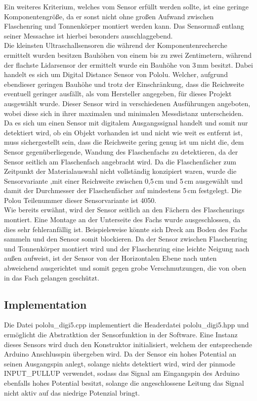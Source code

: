         Ein weiteres Kriterium, welches vom Sensor erfüllt werden sollte, ist eine geringe Komponentengröße, da er sonst nicht ohne großen Aufwand zwischen Flaschenring und Tonnenkörper montiert werden kann. Das Sensormaß entlang seiner Messachse ist hierbei besonders ausschlaggebend.\\

        Die kleinsten Ultraschallsensoren die während der Komponentenrecherche ermittelt wurden besitzen Bauhöhen von einem bis zu zwei Zentimetern, während der flachste Lidarsensor der ermittelt wurde ein Bauhöhe von 3\,mm besitzt. Dabei handelt es sich um Digital Distance Sensor von Pololu. Welcher, aufgrund ebendieser geringen Bauhöhe und trotz der Einschränkung, dass die Reichweite eventuell geringer ausfällt, als vom Hersteller angegeben, für dieses Projekt ausgewählt wurde. Dieser Sensor wird in verschiedenen Ausführungen angeboten, wobei diese sich in ihrer maximalen und minimalen Messdistanz unterscheiden. Da es sich um einen Sensor mit digitalem Ausgangssignal handelt und somit nur detektiert wird, ob ein Objekt vorhanden ist und nicht wie weit es entfernt ist, muss sichergestellt sein, dass die Reichweite gering genug ist um nicht die, dem Sensor gegenüberliegende, Wandung des Flaschenfachs zu detektieren, da der Sensor seitlich am Flaschenfach angebracht wird. Da die Flaschenfächer zum Zeitpunkt der Materialauswahl nicht vollständig konzipiert waren, wurde die Sensorvariante ,mit einer Reichweite zwischen 0,5\,cm und 5\,cm ausgewählt und damit der Durchmesser der Flaschenfächer auf mindestens 5\,cm festgelegt. Die Polou Teilenummer dieser Sensorvariante ist 4050.\\
        
        Wie bereits erwähnt, wird der Sensor seitlich an den Fächern des Flaschenrings montiert. Eine Montage an der Unterseite des Fachs wurde ausgeschlossen, da dies sehr fehleranfällig ist. Beispielsweise könnte sich Dreck am Boden des Fachs sammeln und den Sensor somit blockieren. Da der Sensor zwischen Flaschenring und Tonnenkörper montiert wird und der Flaschenring eine leichte Neigung nach außen aufweist, ist der Sensor von der Horizontalen Ebene nach unten abweichend ausgerichtet und somit gegen grobe Verschmutzungen, die von oben in das Fach gelangen geschützt.\\

    \subsection{Implementation}
        Die Datei pololu\_digi5.cpp implementiert die Headerdatei pololu\_digi5.hpp und ermöglicht die Abstratktion der Sensorfunktion in der Software. Eine Instanz dieses Sensors wird duch den Konstruktor initialisiert, welchem der entsprechende Arduino Anschlusspin übergeben wird. Da der Sensor ein hohes Potential an seinen Ausgangspin anlegt, solange nichts detektiert wird, wird der pinmode INPUT_PULLUP verwendet, sodass das Signal am Eingangspin des Arduino ebenfalls hohes Potential besitzt, solange die angeschlossene Leitung das Signal nicht aktiv auf das niedrige Potenzial bringt.\\

